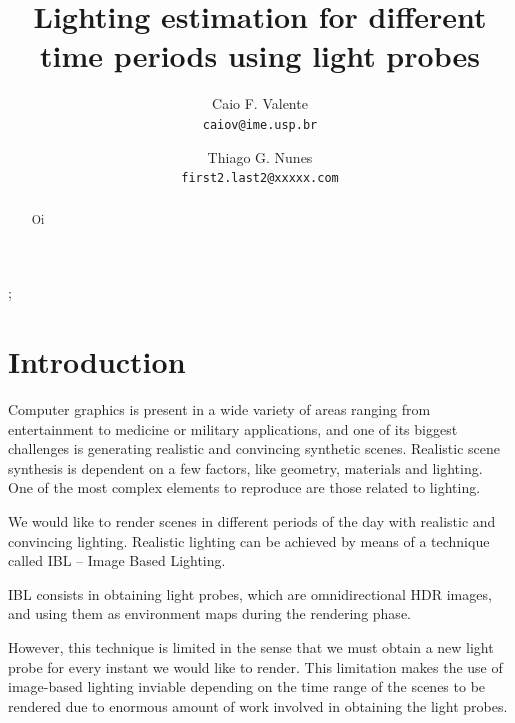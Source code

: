 \documentclass[conference]{acmsiggraph}
\title{Lighting estimation for different time periods using light probes}
\author{
  Caio F. Valente\\
  \texttt{caiov@ime.usp.br}
  \and
  Thiago G. Nunes\\
  \texttt{first2.last2@xxxxx.com}
}
\begin{document}

\maketitle

\begin{abstract}
	Oi
\end{abstract}

\begin{CRcatlist}
  ;
\end{CRcatlist}

\keywordlist


\TOGlinkslist


\copyrightspace

\section{Introduction}

	Computer graphics is present in a wide variety of areas ranging from entertainment to medicine or military applications, and one of its biggest challenges is generating realistic and convincing synthetic scenes. Realistic scene synthesis is dependent on a few factors, like geometry, materials and lighting. One of the most complex elements to reproduce are those related to lighting.

	We would like to render scenes in different periods of the day with realistic and convincing lighting. Realistic lighting can be achieved by means of a technique called IBL – Image Based Lighting. 

	IBL consists in obtaining light probes, which are omnidirectional HDR images, and using them as environment maps during the rendering phase.

	However, this technique is limited in the sense that we must obtain a new light probe for every instant we would like to render. This limitation makes the use of image-based lighting inviable depending on the time range of the scenes to be rendered due to enormous amount of work involved in obtaining the light probes.
\end{document}
